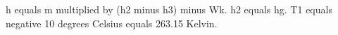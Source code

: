 h equals m multiplied by (h2 minus h3) minus Wk.  
h2 equals hg.  
T1 equals negative 10 degrees Celsius equals 263.15 Kelvin.